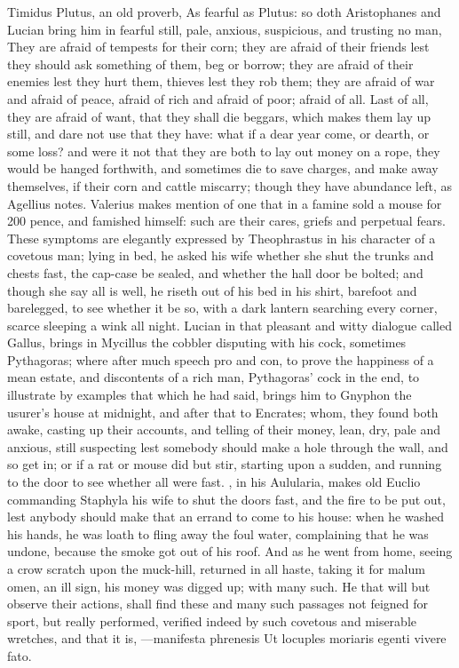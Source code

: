 {{Timidus Plutus, an old proverb, As fearful as Plutus: so doth
Aristophanes and Lucian bring him in fearful still, pale, anxious,
suspicious, and trusting no man, They are afraid of tempests for
their corn; they are afraid of their friends lest they should ask
something of them, beg or borrow; they are afraid of their enemies lest
they hurt them, thieves lest they rob them; they are afraid of war and
afraid of peace, afraid of rich and afraid of poor; afraid of all. Last
of all, they are afraid of want, that they shall die beggars, which
makes them lay up still, and dare not use that they have: what if a
dear year come, or dearth, or some loss? and were it not that they are
both to lay out money on a rope, they would be hanged forthwith,
and sometimes die to save charges, and make away themselves, if their
corn and cattle miscarry; though they have abundance left, as
Agellius notes. Valerius makes mention of one that in a
famine sold a mouse for 200 pence, and famished himself: such are their
cares, griefs and perpetual fears. These symptoms are elegantly
expressed by Theophrastus in his character of a covetous man;
lying in bed, he asked his wife whether she shut the trunks and
chests fast, the cap-case be sealed, and whether the hall door be
bolted; and though she say all is well, he riseth out of his bed in his
shirt, barefoot and barelegged, to see whether it be so, with a dark
lantern searching every corner, scarce sleeping a wink all night.
Lucian in that pleasant and witty dialogue called Gallus, brings in
Mycillus the cobbler disputing with his cock, sometimes Pythagoras;
where after much speech pro and con, to prove the happiness of a mean
estate, and discontents of a rich man, Pythagoras' cock in the end, to
illustrate by examples that which he had said, brings him to Gnyphon
the usurer's house at midnight, and after that to Encrates; whom, they
found both awake, casting up their accounts, and telling of their
money, lean, dry, pale and anxious, still suspecting lest
somebody should make a hole through the wall, and so get in; or if a
rat or mouse did but stir, starting upon a sudden, and running to the
door to see whether all were fast. \Plautus{}, in his Aulularia, makes old
Euclio commanding Staphyla his wife to shut the doors fast, and
the fire to be put out, lest anybody should make that an errand to come
to his house: when he washed his hands, he was loath to fling
away the foul water, complaining that he was undone, because the smoke
got out of his roof. And as he went from home, seeing a crow scratch
upon the muck-hill, returned in all haste, taking it for malum omen, an
ill sign, his money was digged up; with many such. He that will but
observe their actions, shall find these and many such passages not
feigned for sport, but really performed, verified indeed by such
covetous and miserable wretches, and that it is,
---manifesta phrenesis
Ut locuples moriaris egenti vivere fato.

}}
